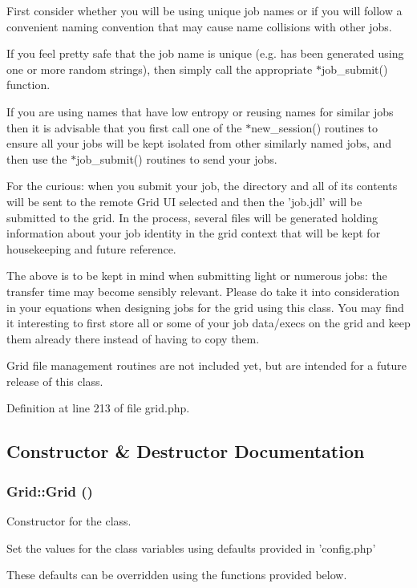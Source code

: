 First consider whether you will be using unique job names or if you will follow a convenient naming convention that may cause name collisions with other jobs.

If you feel pretty safe that the job name is unique (e.g. has been generated using one or more random strings), then simply call the appropriate $\ast$job\_\-submit() function.

If you are using names that have low entropy or reusing names for similar jobs then it is advisable that you first call one of the $\ast$new\_\-session() routines to ensure all your jobs will be kept isolated from other similarly named jobs, and then use the $\ast$job\_\-submit() routines to send your jobs.

For the curious: when you submit your job, the directory and all of its contents will be sent to the remote Grid UI selected and then the 'job.jdl' will be submitted to the grid. In the process, several files will be generated holding information about your job identity in the grid context that will be kept for housekeeping and future reference.

The above is to be kept in mind when submitting light or numerous jobs: the transfer time may become sensibly relevant. Please do take it into consideration in your equations when designing jobs for the grid using this class. You may find it interesting to first store all or some of your job data/execs on the grid and keep them already there instead of having to copy them.

Grid file management routines are not included yet, but are intended for a future release of this class. 



Definition at line 213 of file grid.php.

\subsection{Constructor \& Destructor Documentation}
\subsubsection{\setlength{\rightskip}{0pt plus 5cm}Grid::Grid ()}\label{classGrid_a0}


Constructor for the class. 

Set the values for the class variables using defaults provided in 'config.php'

These defaults can be overridden using the functions provided below. 

